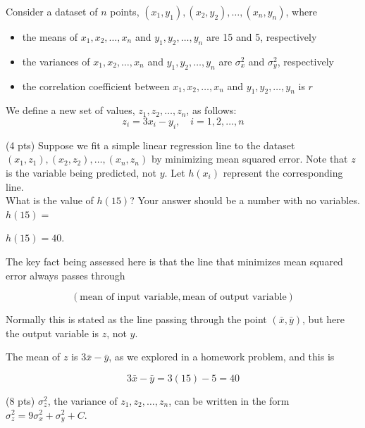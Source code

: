 \documentclass[11pt]{article}
\begin{document}
\newpage

\begin{prob}
Consider a dataset of $n$ points, $(x_1, y_1), (x_2, y_2), \ldots, (x_n, y_n)$, where

\begin{itemize}
\item the means of $x_1, x_2, \ldots, x_n$ and $y_1, y_2, \ldots, y_n$ are 15 and 5, respectively
\item the variances of $x_1, x_2, \ldots, x_n$ and $y_1, y_2, \ldots, y_n$ are $\sigma_x^2$ and $\sigma_y^2$, respectively
\item the correlation coefficient between $x_1, x_2, \ldots, x_n$ and $y_1, y_2, \ldots, y_n$ is $r$
\end{itemize}

We define a new set of values, $z_1, z_2, \ldots, z_n$, as follows:
$$z_i = 3x_i - y_i, \quad i = 1, 2, \ldots, n$$

\begin{subprob}(4 pts) Suppose we fit a simple linear regression line to the dataset $(x_1, z_1), (x_2, z_2), \ldots, (x_n, z_n)$ by minimizing mean squared error. Note that $z$ is the variable being predicted, not $y$. Let $h(x_i)$ represent the corresponding line. \\

What is the value of $h(15)$? Your answer should be a number with no variables. \\

$h(15) = $ 

\begin{solution}
$h(15) = 40$.

The key fact being assessed here is that the line that minimizes mean squared error always passes through

$$(\text{mean of input variable}, \text{mean of output variable})$$

Normally this is stated as the line passing through the point $(\bar{x}, \bar{y})$, but here the output variable is $z$, not $y$.

The mean of $z$ is $3 \bar{x} - \bar{y}$, as we explored in a homework problem, and this is

$$3 \bar{x} - \bar{y} = 3(15) - 5 = 40$$

\end{solution}

\end{subprob}

\begin{subprob}(8 pts) $\sigma_z^2$, the variance of $z_1, z_2, \ldots, z_n$, can be written in the form $\sigma_z^2 = 9 \sigma_x^2 + \sigma_y^2 + C$.
  

\end{subprob}
\end{prob}
\end{document}
